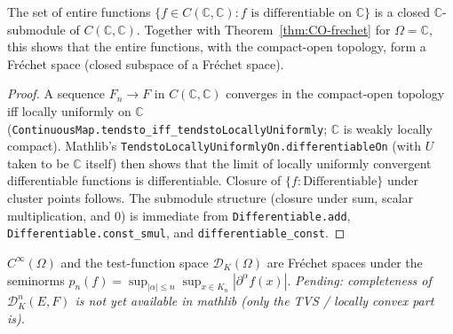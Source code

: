\begin{theorem}[Rudin 1.45 (Fréchet part, $\Omega = \mathbb C$):
  entire functions are a closed subspace of $C(\mathbb C, \mathbb C)$]
  \label{thm:entire-isClosed}
  \leanok
  The set of entire functions
  $\{f \in C(\mathbb C, \mathbb C) : f \text{ is differentiable on }
  \mathbb C\}$ is a closed $\mathbb C$-submodule of
  $C(\mathbb C, \mathbb C)$. Together with
  Theorem~\ref{thm:CO-frechet} for $\Omega = \mathbb C$, this shows
  that the entire functions, with the compact-open topology, form a
  Fréchet space (closed subspace of a Fréchet space).
\end{theorem}
\begin{proof}
  \leanok
  A sequence $F_n \to F$ in $C(\mathbb C, \mathbb C)$ converges in the
  compact-open topology iff locally uniformly on $\mathbb C$
  (\texttt{ContinuousMap.tendsto\_iff\_tendsto\-LocallyUniformly};
  $\mathbb C$ is weakly locally compact). Mathlib's
  \texttt{TendstoLocallyUniformlyOn.differentiableOn} (with $U$ taken
  to be $\mathbb C$ itself) then shows that the limit of locally
  uniformly convergent differentiable functions is differentiable.
  Closure of $\{f : \text{Differentiable}\}$ under cluster points
  follows. The submodule structure (closure under sum, scalar
  multiplication, and $0$) is immediate from
  \texttt{Differentiable.add}, \texttt{Differentiable.const\_smul},
  and \texttt{differentiable\_const}.
\end{proof}

\begin{theorem}
  \label{thm:Cinfty-frechet}
  $C^\infty(\Omega)$ and the test-function space $\mathcal D_K(\Omega)$
  are Fréchet spaces under the seminorms $p_n(f) = \sup_{|\alpha| \le
  n}\sup_{x \in K_n} |\partial^\alpha f(x)|$.
  \emph{Pending: completeness of $\mathcal D^n_K(E, F)$ is not yet
  available in mathlib (only the TVS / locally convex part is).}
\end{theorem}

